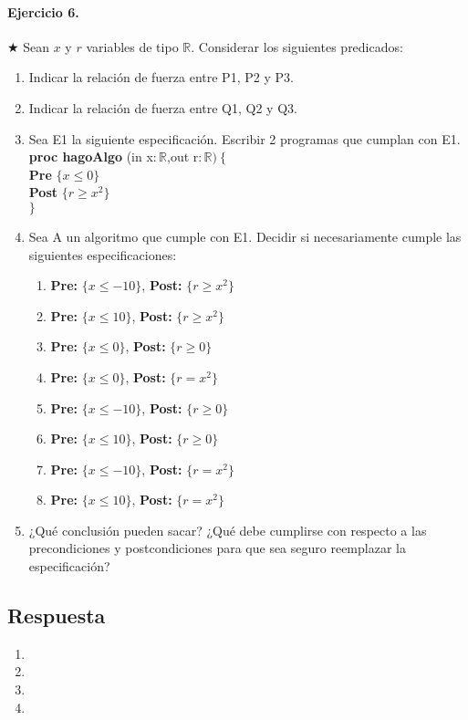 \documentclass[a4paper]{article}
\begin{document}
\paragraph*{Ejercicio 6.}$\bigstar$ Sean $x$ y $r$ variables de tipo $\mathbb{R}$. Considerar los siguientes predicados:
	\begin{enumerate}[label=\alph*)]
		\item Indicar la relación de fuerza entre P1, P2 y P3.
		\item Indicar la relación de fuerza entre Q1, Q2 y Q3.
		\item Sea E1 la siguiente especificación. Escribir 2 programas que cumplan con E1.\medskip \\
		\textbf{proc hagoAlgo }(in x$: \mathbb{R}$,out r$:\mathbb{R})\ \{$\smallskip \\
		\hspace*{6mm} \textbf{Pre }$\{ x\leq 0\}$\smallskip \\
		\hspace*{6mm} \textbf{Post }$\{r \geq x^2\}$\\
		$\}$
		\item Sea A un algoritmo que cumple con E1. Decidir si necesariamente cumple las siguientes especificaciones:
		\begin{enumerate}[label=\alph*)]
			\item \textbf{Pre: }$\{x\leq -10\}$, \textbf{Post: }$\{r\geq x^2\}$
			\item \textbf{Pre: }$\{x\leq 10\}$, \textbf{Post: }$\{r\geq x^2\}$
			\item \textbf{Pre: }$\{x\leq 0\}$, \textbf{Post: }$\{r\geq 0\}$
			\item \textbf{Pre: }$\{x\leq 0\}$, \textbf{Post: }$\{r= x^2\}$
			\item \textbf{Pre: }$\{x\leq -10\}$, \textbf{Post: }$\{r\geq 0\}$
			\item \textbf{Pre: }$\{x\leq 10\}$, \textbf{Post: }$\{r\geq 0\}$
			\item \textbf{Pre: }$\{x\leq -10\}$, \textbf{Post: }$\{r= x^2\}$
			\item \textbf{Pre: }$\{x\leq 10\}$, \textbf{Post: }$\{r= x^2\}$
		\end{enumerate}
		\item ¿Qué conclusión pueden sacar? ¿Qué debe cumplirse con respecto a las precondiciones y postcondiciones para que sea seguro reemplazar la especificación?
	\end{enumerate}
\subsection*{Respuesta}
	\begin{enumerate}[label=\alph*)]
		\item
		\item
		\item
		\item
	\end{enumerate}
\end{document}
